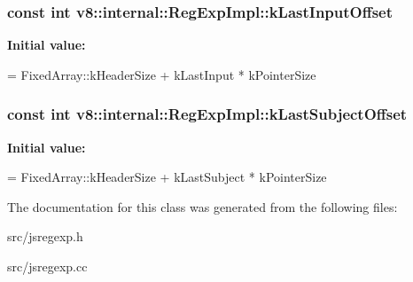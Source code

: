 \subsubsection[{k\+Last\+Input\+Offset}]{\setlength{\rightskip}{0pt plus 5cm}const int v8\+::internal\+::\+Reg\+Exp\+Impl\+::k\+Last\+Input\+Offset\hspace{0.3cm}{\ttfamily [static]}}\label{classv8_1_1internal_1_1_reg_exp_impl_a64f715e3ff891b06206c35ce658800e8}
{\bfseries Initial value\+:}
\begin{DoxyCode}
=
      FixedArray::kHeaderSize + kLastInput * kPointerSize
\end{DoxyCode}
\hypertarget{classv8_1_1internal_1_1_reg_exp_impl_a43777bf0219877ec08e0076083c37b08}{}
\subsubsection[{k\+Last\+Subject\+Offset}]{\setlength{\rightskip}{0pt plus 5cm}const int v8\+::internal\+::\+Reg\+Exp\+Impl\+::k\+Last\+Subject\+Offset\hspace{0.3cm}{\ttfamily [static]}}\label{classv8_1_1internal_1_1_reg_exp_impl_a43777bf0219877ec08e0076083c37b08}
{\bfseries Initial value\+:}
\begin{DoxyCode}
=
      FixedArray::kHeaderSize + kLastSubject * kPointerSize
\end{DoxyCode}


The documentation for this class was generated from the following files\+:\begin{DoxyCompactItemize}
\item 
src/jsregexp.\+h\item 
src/jsregexp.\+cc\end{DoxyCompactItemize}
